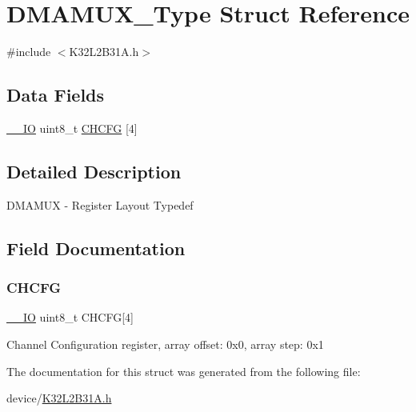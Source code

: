\hypertarget{struct_d_m_a_m_u_x___type}{}\section{D\+M\+A\+M\+U\+X\+\_\+\+Type Struct Reference}
\label{struct_d_m_a_m_u_x___type}


{\ttfamily \#include $<$K32\+L2\+B31\+A.\+h$>$}

\subsection*{Data Fields}
\begin{DoxyCompactItemize}
\item 
\mbox{\hyperlink{core__cm0plus_8h_aec43007d9998a0a0e01faede4133d6be}{\+\_\+\+\_\+\+IO}} uint8\+\_\+t \mbox{\hyperlink{struct_d_m_a_m_u_x___type_a98b3bd1909ec5d4b7ea675dcfa2d4662}{C\+H\+C\+FG}} \mbox{[}4\mbox{]}
\end{DoxyCompactItemize}


\subsection{Detailed Description}
D\+M\+A\+M\+UX -\/ Register Layout Typedef 

\subsection{Field Documentation}
\mbox{\label{struct_d_m_a_m_u_x___type_a98b3bd1909ec5d4b7ea675dcfa2d4662}} 
\subsubsection{\texorpdfstring{CHCFG}{CHCFG}}
{\footnotesize\ttfamily \mbox{\hyperlink{core__cm0plus_8h_aec43007d9998a0a0e01faede4133d6be}{\+\_\+\+\_\+\+IO}} uint8\+\_\+t C\+H\+C\+FG\mbox{[}4\mbox{]}}

Channel Configuration register, array offset\+: 0x0, array step\+: 0x1 

The documentation for this struct was generated from the following file\+:\begin{DoxyCompactItemize}
\item 
device/\mbox{\hyperlink{_k32_l2_b31_a_8h}{K32\+L2\+B31\+A.\+h}}\end{DoxyCompactItemize}
